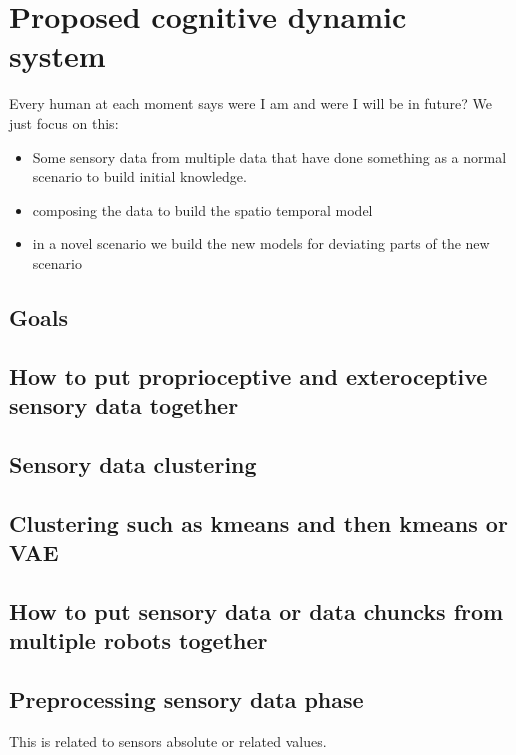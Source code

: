 \chapter{Proposed cognitive dynamic system}
Every human at each moment says were I am and were I will be in future?
We just focus on this: 
\begin{itemize}
    \item Some sensory data from multiple data that have done something as a normal scenario to build initial knowledge. 
    \item composing the data to build the spatio temporal model
    \item in a novel scenario we build the new models for deviating parts of the new scenario
\end{itemize}


\section{Goals}


\section{How to put proprioceptive and exteroceptive sensory data together}
    

\section{Sensory data clustering}
    \section{Clustering such as kmeans and then kmeans or VAE}

\section{How to put sensory data or data chuncks from multiple robots together}

\section{Preprocessing sensory data phase}
     This is related to sensors absolute or related values. 
    
